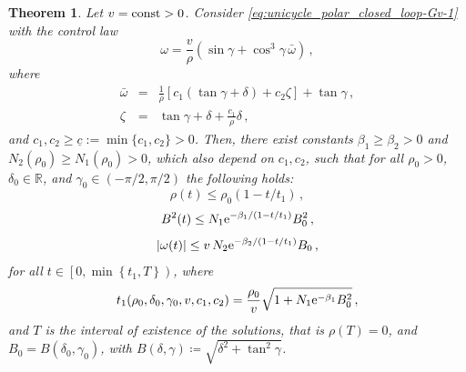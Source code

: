 \documentclass[letterpaper, 10 pt, conference]{ieeeconf}  %
\newtheorem{theorem}{Theorem}
\begin{document}
\begin{theorem}%
\label{thm:Dubins-FT-stabilize7}
Let $v=\mbox{\rm const}>0$. Consider \eqref{eq:unicycle_polar_closed_loop-Gv-1}
with the control law  
\begin{equation}
    \omega =\frac{v}{\rho} \left(\sin\gamma +\cos^3\gamma \, \bar\omega\right)\,,
\end{equation}
where
\begin{subequations}
\label{eq-third-controller67}
\begin{eqnarray}
\label{eq-third-controller267}
\bar\omega &=& \frac{1}{\rho}[c_1(\tan\gamma +\delta)+c_2\zeta] +\tan\gamma\,,
\\
\label{eq-third-controller37}
\zeta &=& \tan\gamma +\delta +\frac{c_1}{\rho}\delta\,,
\end{eqnarray}
\end{subequations}
and $c_1,c_2 \geq \underline c :=\min\{c_1,c_2\} > 0$. Then, there exist 
constants $\beta_1\geq \beta_2 >0$ and $N_2(\rho_0)\geq N_1(\rho_0) >0$, which also depend on $c_1,c_2$, 
such that for all $\rho_0>0$, $\delta_0\in\mathbb{R}$, and $\gamma_0\in(-\pi/2,\pi/2)$ the following holds:
\begin{equation}
\label{eq2-rho-bound}
\rho(t)\leq \rho_0 (1-t/t_1) \,,
\end{equation}
\begin{equation}
\label{eq2-deltan-bound}
B^2(t) \leq 
N_1 {\rm e}^{-\beta_1/({1-t/t_1})} 
B^2_0 \,,
\end{equation}
\begin{align}
\label{eq2-omega(t)-bound}
|\omega(t)| \leq v \, 
N_2 {\rm e}^{-\beta_2/({1-t/t_1})}
B_0 \,,
\end{align}
for all $t\in\left[0, \min\left\{t_1,T\right\} \right)$, where
\begin{equation}
\label{eq-t1N1beta1}
t_1(\rho_0,\delta_0, \gamma_0, v,c_1,c_2) =\frac{\rho_0}{v}{\sqrt{1+N_1 {\rm e}^{-\beta_1}B^2_0}}\,,
\end{equation}
and $T$ is the interval of existence of the solutions, that is $\rho(T)=0$, and $B_0 = B(\delta_0,\gamma_0)$, with $B(\delta,\gamma) \coloneqq \sqrt{\delta^2 + \tan^2\gamma}$.
\end{theorem}
\end{document}
